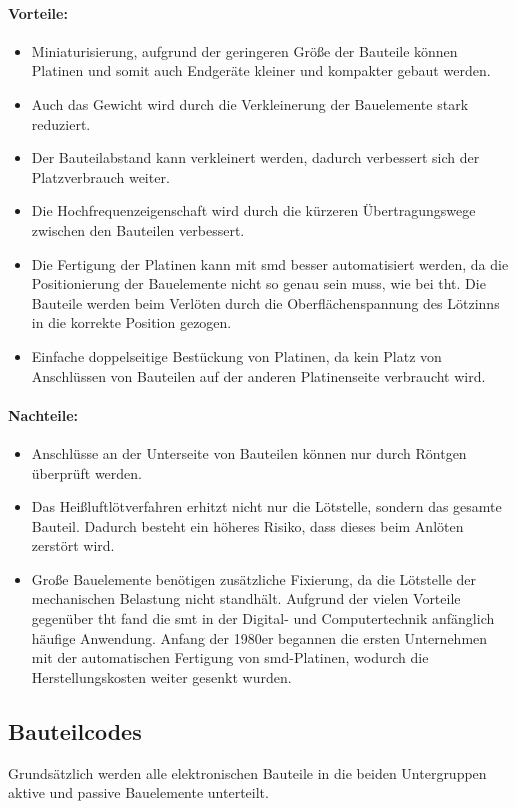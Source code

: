 \paragraph{Vorteile:}
\begin{itemize}
	\item Miniaturisierung, aufgrund der geringeren Größe der Bauteile können Platinen und somit auch Endgeräte kleiner und kompakter gebaut werden.
	\item Auch das Gewicht wird durch die Verkleinerung der Bauelemente stark reduziert.
	\item Der Bauteilabstand kann verkleinert werden, dadurch verbessert sich der Platzverbrauch weiter.
	\item Die Hochfrequenzeigenschaft wird durch die kürzeren Übertragungswege zwischen den Bauteilen verbessert.
	\item Die Fertigung der Platinen kann mit \ac{smd} besser automatisiert werden, da die Positionierung der Bauelemente nicht so genau sein muss, wie bei \ac{tht}.
	Die Bauteile werden beim Verlöten durch die Oberflächenspannung des Lötzinns in die korrekte Position gezogen.
	\item Einfache doppelseitige Bestückung von Platinen, da kein Platz von Anschlüssen von Bauteilen auf der anderen Platinenseite verbraucht wird.
\end{itemize}

\paragraph{Nachteile:}
\begin{itemize}
	\item Anschlüsse an der Unterseite von Bauteilen können nur durch Röntgen überprüft werden.
	\item Das Heißluftlötverfahren erhitzt nicht nur die Lötstelle, sondern das gesamte Bauteil.
 	Dadurch besteht ein höheres Risiko, dass dieses beim Anlöten zerstört wird.
 	\item Große Bauelemente benötigen zusätzliche Fixierung, da die Lötstelle der mechanischen Belastung nicht standhält.
	Aufgrund der vielen Vorteile gegenüber \ac{tht} fand die \ac{smt} in der Digital- und Computertechnik anfänglich häufige Anwendung.
	Anfang der 1980er begannen die ersten Unternehmen mit der automatischen Fertigung von \ac{smd}-Platinen, wodurch die Herstellungskosten weiter gesenkt wurden.	
\end{itemize}

\subsection{Bauteilcodes}
Grundsätzlich werden alle elektronischen Bauteile in die beiden Untergruppen aktive und passive Bauelemente unterteilt.\par

